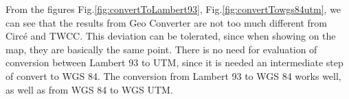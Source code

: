 \begin{figure}[!htbp]
\end{figure}


\begin{figure}[!htbp]
\end{figure}

From the figures Fig.\ref{fig:convertToLambert93}, Fig.\ref{fig:convertTowgs84utm}, we can see that the results from Geo Converter are not too much different from Circ\'e and TWCC. This deviation can be tolerated, since when showing on the map, they are basically the same point.
There is no need for evaluation of conversion between Lambert 93 to UTM, since it is needed an intermediate step of convert to WGS 84. The conversion from Lambert 93 to WGS 84 works well, as well as from WGS 84 to WGS UTM. 


